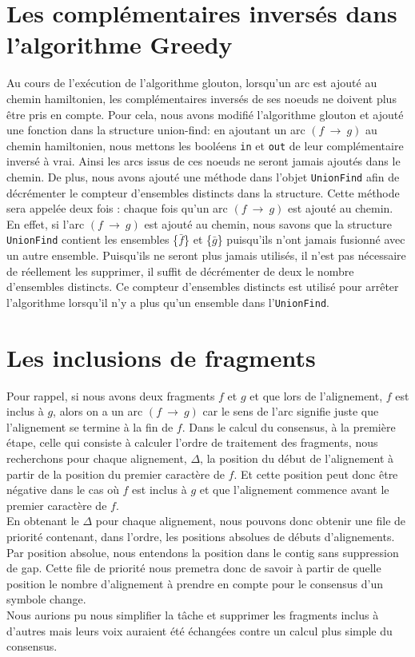 \documentclass[a4paper, 12pt, titlepage]{article}
\newcommand{\arc}[2]{$(#1~\rightarrow~#2)$}
\begin{document}




\section{Les complémentaires inversés dans l'algorithme Greedy}%
Au cours de l'exécution de l'algorithme glouton, lorsqu'un arc est ajouté au chemin hamiltonien, les complémentaires inversés de ses noeuds ne doivent plus être pris en compte.
Pour cela, nous avons modifié l'algorithme glouton et ajouté une fonction dans la structure union-find:
en ajoutant un arc \arc{f}{g} au chemin hamiltonien, nous mettons les booléens \texttt{in} et \texttt{out} de leur complémentaire inversé à vrai.
Ainsi les arcs issus de ces noeuds ne seront jamais ajoutés dans le chemin.
De plus, nous avons ajouté une méthode dans l'objet \texttt{UnionFind} afin de décrémenter le compteur d'ensembles distincts dans la structure.
Cette méthode sera appelée deux fois : chaque fois qu'un arc \arc{f}{g} est ajouté au chemin.
En effet, si l'arc \arc{f}{g} est ajouté au chemin, nous savons que la structure \texttt{UnionFind} contient les ensembles \{$\bar{f}$\} et \{$\bar{g}$\} puisqu'ils n'ont jamais fusionné avec un autre ensemble.
Puisqu'ils ne seront plus jamais utilisés, il n'est pas nécessaire de
réellement les supprimer, il suffit de décrémenter de deux le nombre d'ensembles distincts.
Ce compteur d'ensembles distincts est utilisé pour arrêter l'algorithme
lorsqu'il n'y a plus qu'un ensemble dans l'\texttt{UnionFind}.

\section{Les inclusions de fragments}
Pour rappel, si nous avons deux fragments $f$ et $g$ et que lors de l'alignement, $f$ est inclus à $g$,
alors on a un arc \arc{f}{g} car le sens de l'arc signifie juste que l'alignement se termine à la fin de $f$.
Dans le calcul du consensus, à la première étape, celle qui consiste à calculer l'ordre de traitement des fragments,
nous recherchons pour chaque alignement, $\Delta$, la position du début de l'alignement à partir de la position du premier caractère de $f$.
Et cette position peut donc être négative dans le cas où $f$ est inclus à $g$ et que l'alignement commence avant le premier caractère de $f$.\\

En obtenant le $\Delta$ pour chaque alignement, nous pouvons donc obtenir une file de priorité contenant, dans l'ordre, les positions absolues de débuts d'alignements.
Par position absolue, nous entendons la position dans le contig sans suppression de gap.
Cette file de priorité nous premetra donc de savoir à partir de quelle position le nombre d'alignement à prendre en compte pour le consensus d'un symbole change.\\


Nous aurions pu nous simplifier la tâche et supprimer les fragments inclus à
d'autres mais leurs voix auraient été échangées contre un calcul plus simple
du consensus.


\end{document}

